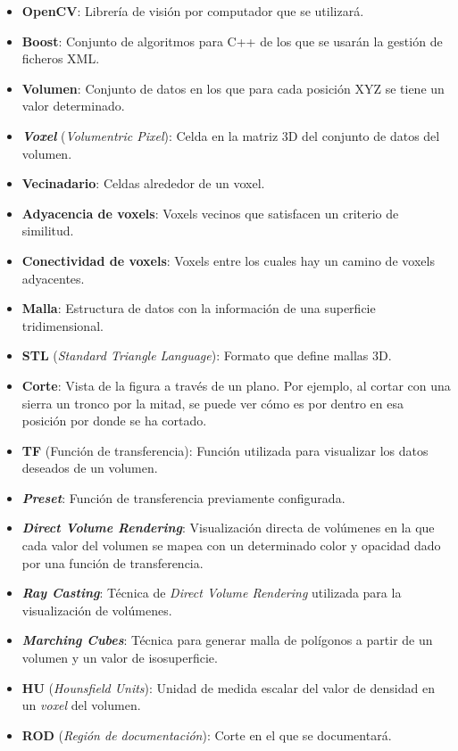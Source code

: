 \begin{itemize}
	\item \textbf{OpenCV}: Librería de visión por computador que se utilizará.
	\item \textbf{Boost}: Conjunto de algoritmos para C++ de los que se usarán la gestión de ficheros XML.
	\item \textbf{Volumen}: Conjunto de datos en los que para cada posición XYZ se tiene un valor determinado.
	\item \textbf{\textit{Voxel}} (\textit{Volumentric Pixel}): Celda en la matriz 3D del conjunto de datos del volumen.
	\item \textbf{Vecinadario}: Celdas alrededor de un voxel.
	\item \textbf{Adyacencia de voxels}: Voxels vecinos que satisfacen un criterio de similitud.
	\item \textbf{Conectividad de voxels}: Voxels entre los cuales hay un camino de voxels adyacentes.
	\item \textbf{Malla}: Estructura de datos con la información de una superficie tridimensional.
	\item \textbf{STL} (\textit{Standard Triangle Language}): Formato que define mallas 3D.
	\item \textbf{Corte}: Vista de la figura a través de un plano. Por ejemplo, al cortar con una sierra un tronco por la mitad, se puede ver cómo es por dentro en esa posición por donde se ha cortado.
	\item \textbf{TF} (Función de transferencia): Función utilizada para visualizar los datos deseados de un volumen.
	\item \textbf{\textit{Preset}}: Función de transferencia previamente configurada.
	\item \textbf{\textit{Direct Volume Rendering}}: Visualización directa de volúmenes en la que cada valor del volumen se mapea con un determinado color y opacidad dado por una función de transferencia.
	\item \textbf{\textit{Ray Casting}}: Técnica de \textit{Direct Volume Rendering} utilizada para la visualización de volúmenes.
	\item \textbf{\textit{Marching Cubes}}: Técnica para generar malla de polígonos a partir de un volumen y un valor de isosuperficie.
	\item \textbf{HU} (\textit{Hounsfield Units}): Unidad de medida escalar del valor de densidad en un \textit{voxel} del volumen.
	\item \textbf{ROD} (\textit{Región de documentación}): Corte en el que se documentará.

\end{itemize}
